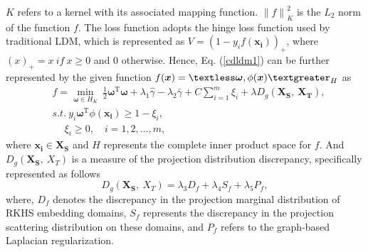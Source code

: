 \documentclass[a4paper]{cas-sc}
\begin{document}
$K$ refers to a kernel with its associated mapping function.
${\|f\|}_{K}^{2}$ is the $L_2$ norm of the function $f$. The loss function adopts the hinge loss function used by traditional LDM, which is represented as $V = (1-y_if(\boldsymbol{x_i}))_+$, where $(x)_+ = x\ if\ x\geq 0$ and 0 otherwise. Hence, Eq. (\ref{cdldm1}) can be further represented by the given function $f(\boldsymbol{x}) = \textless\boldsymbol{\omega},\phi(\boldsymbol{x})\textgreater_H$ as
\begin{equation}\label{cdldm2}
\begin{aligned}
&f = \min _{\boldsymbol{\omega} \in H_K} \ \frac{1}{2}\boldsymbol{\omega}^{\mathrm{T}}\boldsymbol{\omega} + \lambda_1\widehat \gamma - \lambda_2\bar \gamma + C\sum\limits_{i = 1}^m\xi_i + \lambda D_{g}(\boldsymbol{X_S},\ \boldsymbol{X_T}), \\
& s.t.\ y_{i}\boldsymbol{\omega}^{\mathrm{T}}\phi(\boldsymbol{x_i})\geq 1-\xi_{i},\\
&\ \quad \xi_{i} \geq 0,\quad i=1,2, \ldots, m,
\end{aligned}    
\end{equation}
where $\boldsymbol{x_i} \in \boldsymbol{X_S}$ and $H$ represents the complete inner product space for $f$. And $D_{g}(\boldsymbol{X_S},\ X_T)$ is a measure of the projection distribution discrepancy, specifically represented as follows
\begin{equation}
D_{g}(\boldsymbol{X_S},\ X_T) = \lambda_3 D_f + \lambda_4 S_f + \lambda_5 P_f,
\end{equation}
where, $D_f$ denotes the discrepancy in the projection marginal distribution of RKHS embedding domains, $S_f$ represents the discrepancy in the projection scattering distribution on these domains, and $P_f$ refers to the graph-based Laplacian regularization.

\end{document}
